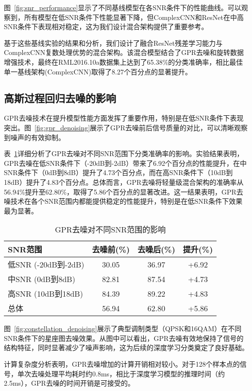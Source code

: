 \documentclass[conference]{IEEEtran}
\begin{document}
图~\ref{fig:snr_performance}显示了不同基线模型在各SNR条件下的性能曲线。可以观察到，所有模型在低SNR条件下性能显著下降，但ComplexCNN和ResNet在中高SNR条件下表现相对稳定，这为我们设计混合架构提供了重要参考。

基于这些基线实验的结果和分析，我们设计了融合ResNet残差学习能力与ComplexCNN复数处理优势的混合架构。该混合模型结合了GPR去噪和旋转数据增强技术，最终在RML2016.10a数据集上达到了65.38\%的分类准确率，相比最佳单一基线架构(ComplexCNN)取得了8.27个百分点的显著提升。

\subsection{高斯过程回归去噪的影响}

GPR去噪技术在提升模型性能方面发挥了重要作用，特别是在低SNR条件下表现突出。图~\ref{fig:gpr_denoising}展示了GPR去噪前后信号质量的对比，可以清晰观察到噪声的有效抑制。

表~\ref{tab:gpr_impact}详细分析了GPR去噪对不同SNR范围下分类准确率的影响。实验结果表明，GPR去噪在低SNR条件下（-20dB到-2dB）带来了6.92个百分点的性能提升，在中SNR条件下（0dB到8dB）提升了4.73个百分点，而在高SNR条件下（10dB到18dB）提升了4.83个百分点。总体而言，GPR去噪将轻量级混合架构的准确率从56.94\%提升至62.80\%，取得了5.86个百分点的显著改进。这一结果表明，GPR去噪技术在各个SNR范围内都能提供稳定的性能提升，特别是在低SNR条件下效果最为显著。

\begin{table}[h]
\centering
\caption{GPR去噪对不同SNR范围的影响}
\label{tab:gpr_impact}
\begin{tabular}{@{}lccc@{}}
\toprule
SNR范围 & 去噪前(\%) & 去噪后(\%) & 提升(\%) \\
\midrule
低SNR (-20dB到-2dB) & 30.05 & 36.97 & +6.92 \\
中SNR (0dB到8dB) & 82.81 & 87.54 & +4.73 \\
高SNR (10dB到18dB) & 84.39 & 89.22 & +4.83 \\
总体 & 56.94 & 62.80 & +5.86 \\
\bottomrule
\end{tabular}
\end{table}

图~\ref{fig:constellation_denoising}展示了典型调制类型（QPSK和16QAM）在不同SNR条件下的星座图去噪效果。从图中可以看出，GPR去噪有效地保持了信号的结构特征，同时显著减少了噪声影响，这为后续的深度学习分类奠定了良好基础。

计算复杂度分析表明，GPR去噪增加的计算开销相对较小。对于128个样本点的信号，单次去噪处理平均耗时约0.8ms，相比于深度学习模型的推理时间（约2.5ms），GPR去噪的时间开销是可接受的。
\end{document}

